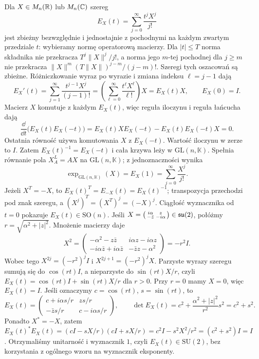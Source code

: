 \begin{przyklad}
\label{prz:matrix-exp-lie}
Dla $X\in M_n(\mathbb{R})$ lub $M_n(\mathbb{C})$ szereg
\[
 E_X(t)=\sum_{j=0}^{\infty}\frac{t^jX^j}{j!}
\]
jest zbieżny bezwzględnie i jednostajnie z pochodnymi
na każdym zwartym przedziale $t$: wybieramy normę
operatorową macierzy. Dla $|t|\leq T$ norma składnika nie
przekracza $T^j\|X\|^j/j!$, a norma jego $m$-tej
pochodnej dla $j\geq m$ nie przekracza
$\|X\|^m(T\|X\|)^{j-m}/(j-m)!$. Szeregi tych oszacowań
są zbieżne. Różniczkowanie wyraz po wyrazie i zmiana
indeksu $\ell=j-1$ dają
\[
 E_X'(t)=\sum_{j=1}^\infty\frac{t^{j-1}X^j}{(j-1)!}
 =\left(\sum_{\ell=0}^\infty\frac{t^\ell X^\ell}{\ell!}\right)X
 =E_X(t)X,\qquad E_X(0)=I.
\]
Macierz $X$ komutuje z każdym $E_X(t)$, więc
reguła iloczynu i reguła łańcucha dają
\[
 \frac{\dd}{\dd t}\bigl(E_X(t)E_X(-t)\bigr)
 =E_X(t)X E_X(-t)-E_X(t)E_X(-t)X=0.
\]
Ostatnia równość używa komutowania $X$ z $E_X(-t)$.
Wartość iloczynu
w zerze to $I$. Zatem $E_X(t)^{-1}=E_X(-t)$
i cała krzywa leży w $\mathrm{GL}(n,\mathbb K)$.
Spełnia równanie pola $X^L_A=AX$ na
$\mathrm{GL}(n,\mathbb K)$; z jednoznaczności wynika
\[
 \exp_{\mathrm{GL}(n,\mathbb K)}(X)
 =E_X(1)=\sum_{j=0}^{\infty}\frac{X^j}{j!}.
\]
Jeżeli $X^T=-X$, to
$E_X(t)^T=E_{-X}(t)=E_X(t)^{-1}$;
transpozycja przechodzi pod znak szeregu,
a $(X^j)^T=(X^T)^j=(-X)^j$.
Ciągłość wyznacznika od $t=0$ pokazuje
$E_X(t)\in\mathrm{SO}(n)$.
Jeśli
$X=\begin{psmallmatrix}i\alpha&z\\-\bar z&-i\alpha\end{psmallmatrix}
\in\mathfrak{su}(2)$, połóżmy $r=\sqrt{\alpha^2+|z|^2}$.
Mnożenie macierzy daje
\[
 X^2=\begin{pmatrix}
 -\alpha^2-z\bar z&i\alpha z-i\alpha z\\
 -i\alpha\bar z+i\alpha\bar z&-\bar z z-\alpha^2
 \end{pmatrix}=-r^2I.
\]
Wobec tego $X^{2j}=(-r^2)^jI$ i
$X^{2j+1}=(-r^2)^jX$.
Parzyste wyrazy szeregu sumują się do $\cos(rt)I$,
a nieparzyste do $\sin(rt)X/r$, czyli
$E_X(t)=\cos(rt)I+\sin(rt)X/r$ dla $r>0$.
Przy $r=0$ mamy $X=0$, więc $E_X(t)=I$.
Jeśli oznaczymy $c=\cos(rt)$, $s=\sin(rt)$, to
\[
 E_X(t)=
 \begin{pmatrix}c+i\alpha s/r&zs/r\\
 -\bar z s/r&c-i\alpha s/r\end{pmatrix},
 \qquad
 \det E_X(t)=c^2+\frac{\alpha^2+|z|^2}{r^2}s^2=c^2+s^2.
\]
Ponadto $X^*=-X$, zatem
$E_X(t)^*E_X(t)=(cI-sX/r)(cI+sX/r)
=c^2I-s^2X^2/r^2=(c^2+s^2)I=I$.
Otrzymaliśmy unitarność i wyznacznik $1$, czyli
$E_X(t)\in\mathrm{SU}(2)$, bez korzystania z ogólnego
wzoru na wyznacznik eksponenty.


\end{przyklad}
